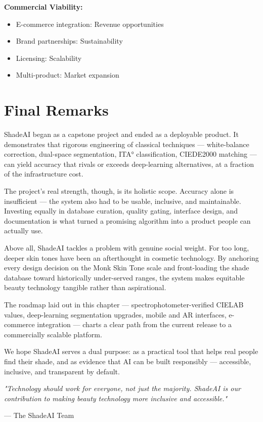 \textbf{Commercial Viability:}
\begin{itemize}
    \item E-commerce integration: Revenue opportunities
    \item Brand partnerships: Sustainability
    \item Licensing: Scalability
    \item Multi-product: Market expansion
\end{itemize}

\section{Final Remarks}

ShadeAI began as a capstone project and ended as a deployable product. It demonstrates that rigorous engineering of classical techniques — white-balance correction, dual-space segmentation, ITA° classification, CIEDE2000 matching — can yield accuracy that rivals or exceeds deep-learning alternatives, at a fraction of the infrastructure cost.

The project's real strength, though, is its holistic scope. Accuracy alone is insufficient — the system also had to be usable, inclusive, and maintainable. Investing equally in database curation, quality gating, interface design, and documentation is what turned a promising algorithm into a product people can actually use.

Above all, ShadeAI tackles a problem with genuine social weight. For too long, deeper skin tones have been an afterthought in cosmetic technology. By anchoring every design decision on the Monk Skin Tone scale and front-loading the shade database toward historically under-served ranges, the system makes equitable beauty technology tangible rather than aspirational.

The roadmap laid out in this chapter — spectrophotometer-verified CIELAB values, deep-learning segmentation upgrades, mobile and AR interfaces, e-commerce integration — charts a clear path from the current release to a commercially scalable platform.

We hope ShadeAI serves a dual purpose: as a practical tool that helps real people find their shade, and as evidence that AI can be built responsibly — accessible, inclusive, and transparent by default.

\vspace{1cm}

\textit{"Technology should work for everyone, not just the majority. ShadeAI is our contribution to making beauty technology more inclusive and accessible."}

\vspace{0.5cm}

\begin{flushright}
— The ShadeAI Team
\end{flushright}
